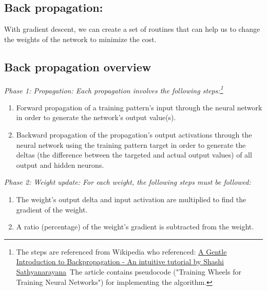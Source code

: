 \documentclass[]{article}
\begin{document}
\begin{multicols}{2}

\section{Back propagation:}

With gradient descent, we can create a set of routines that can help us
to change the weights of the network to minimize the cost.

\subsection{Back propagation overview}

{\texorpdfstring \emph{Phase 1: Propagation: Each propagation
involves the following steps:\footnote{The steps are referenced from
  Wikipedia who referenced:
  \href{http://numericinsight.com/uploads/A_Gentle_Introduction_to_Backpropagation.pdf}{A
  Gentle Introduction to Backpropagation - An intuitive tutorial by
  Shashi Sathyanarayana}~The article contains pseudocode ("Training
  Wheels for Training Neural Networks") for implementing the algorithm.}}{Phase 1: Propagation: Each propagation involves the following steps:}}\label{phase-1-propagation-each-propagation-involves-the-following-steps}

\begin{enumerate}
\def\labelenumi{\arabic{enumi}.}
\item
  Forward propagation of a training pattern's input through the neural
  network in order to generate the network's output value(s).
\item
  Backward propagation of the propagation's output activations through
  the neural network using the training pattern target in order to
  generate the deltas (the difference between the targeted and actual
  output values) of all output and hidden neurons.
\end{enumerate}

\emph{Phase 2: Weight update: For each weight, the following
steps must be
followed:}\label{phase-2-weight-update-for-each-weight-the-following-steps-must-be-followed}

\begin{enumerate}
\def\labelenumi{\arabic{enumi}.}
\item
  The weight's output delta and input activation are multiplied to find
  the gradient of the weight.
\item
  A ratio (percentage) of the weight's gradient is subtracted from the
  weight.
\end{enumerate}


\end{multicols}
\end{document}
